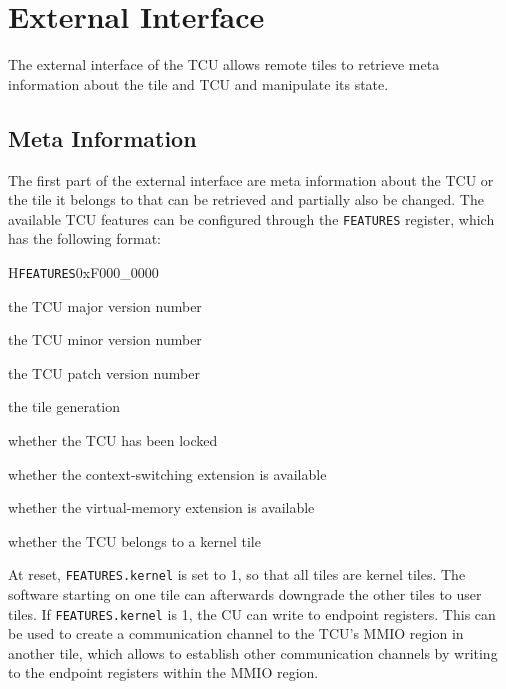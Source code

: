 \chapter{External Interface}

The external interface of the TCU allows remote tiles to retrieve meta information about the tile
and TCU and manipulate its state.

\section{Meta Information}

The first part of the external interface are meta information about the TCU or the tile it belongs
to that can be retrieved and partially also be changed. The available TCU features can be configured
through the \texttt{FEATURES} register, which has the following format:

\setlength{\regWidth}{.95\textwidth}
\begin{register}{H}{\texttt{FEATURES}}{0xF000\_0000}
  \regnewline%
  \begin{regdesc}\begin{reglist}
    \item[vmajor] the TCU major version number
    \item[vminor] the TCU minor version number
    \item[vpatch] the TCU patch version number
    \item[gen] the tile generation
    \item[locked] whether the TCU has been locked
    \item[ctxsw] whether the context-switching extension is available
    \item[vm] whether the virtual-memory extension is available
    \item[kernel] whether the TCU belongs to a kernel tile
  \end{reglist}\end{regdesc}
\end{register}
\setlength{\regWidth}{\textwidth}

\noindent At reset, \texttt{FEATURES.kernel} is set to 1, so that all tiles are kernel tiles. The
software starting on one tile can afterwards downgrade the other tiles to user tiles. If
\texttt{FEATURES.kernel} is 1, the CU can write to endpoint registers. This can be used to create a
communication channel to the TCU's MMIO region in another tile, which allows to establish other
communication channels by writing to the endpoint registers within the MMIO region.

